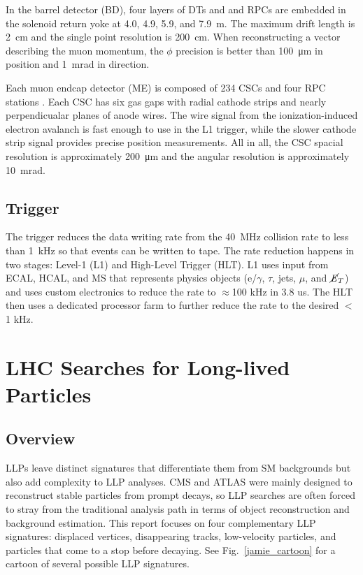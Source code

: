 \documentclass[12pt]{article}
\begin{document}
        In the barrel detector (BD), four layers of DTs and and RPCs are embedded in the solenoid return yoke at \num{4.0}, \num{4.9}, \num{5.9}, and \SI{7.9}{m}. The maximum drift length is \SI{2}{\cm} and the single point resolution is \SI{200}{\cm}. When reconstructing a vector describing the muon momentum, the $\phi$ precision is better than \SI{100}{\micro\m} in position and \SI{1}{\milli\radian} in direction. 

        Each muon endcap detector (ME) is composed of \num{234} CSCs and four RPC stations . Each CSC has six gas gaps with radial cathode strips and nearly perpendicualar planes of anode wires. The wire signal from the ionization-induced electron avalanch is fast enough to use in the L1 trigger, while the slower  cathode strip signal provides precise  position measurements. All in all, the CSC spacial resolution is approximately \SI{200}{\micro\m} and the angular resolution is approximately \SI{10}{\milli\radian}.

    \subsection{Trigger}
        The trigger reduces the data writing rate from the \SI{40}{\mega\hertz} collision rate to less than \SI{1}{\kilo\hertz} so that events can be written to tape. The rate reduction happens in two stages: Level-1 (L1) and High-Level Trigger (HLT). L1 uses input from ECAL, HCAL, and MS that represents physics objects ($\mathrm{e}$/$\gamma$, $\tau$, jets, $\mu$, and $\cancel{\it{E}}_{T}$) and uses custom electronics to reduce the rate to $\approx$100 kHz in 3.8 us. The HLT then uses a dedicated processor farm to further reduce the rate to the desired $<$ 1 kHz.

\section{LHC Searches for Long-lived Particles}
    \subsection{Overview}
        LLPs leave distinct signatures that differentiate them from SM backgrounds but also add complexity to LLP analyses. CMS and ATLAS were mainly designed to reconstruct stable particles from prompt decays, so LLP searches are often forced to stray from the traditional analysis path in terms of object reconstruction and background estimation. This report focuses on four complementary LLP signatures: displaced vertices, disappearing tracks, low-velocity particles, and particles that come to a stop before decaying. See Fig.~\ref{jamie_cartoon} for a cartoon of several possible LLP signatures.
\end{document}
